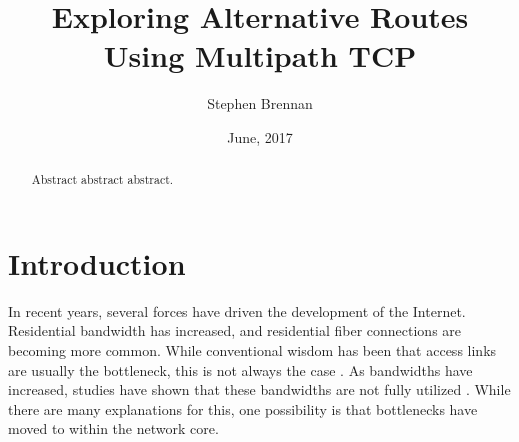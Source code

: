 \documentclass{cwru}
\title{Exploring Alternative Routes Using Multipath TCP}
\author{Stephen Brennan}
\date{June, 2017} %
\begin{document}

%

\maketitle
\makeapprovalsheet

\frontmatter
\tableofcontents

\cleardoublepage
{}
{}
\listoffigures





\acresetall

\begin{abstract}
Abstract abstract abstract.
\end{abstract}

\mainmatter
\chapter{Introduction}

In recent years, several forces have driven the development of the Internet.
Residential bandwidth has increased, and residential fiber connections are
becoming more common. %
While conventional wisdom has been that access links are usually the bottleneck,
this is not always the case \cite{akella2003empirical}. As bandwidths have
increased, studies have shown that these bandwidths are not fully utilized
\cite{fibertothehome}. While there are many explanations for this, one
possibility is that bottlenecks have moved to within the network core.
\end{document}
